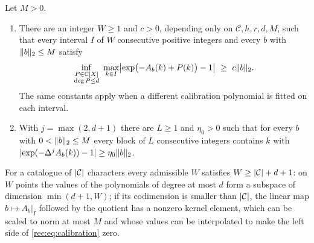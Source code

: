 \begin{theorem}\label{rec:thm:liblock}
Let $M>0$.
\begin{enumerate}[label=\textup{(\roman*)}]
\item There are an integer $W\ge1$ and $c>0$, depending only on $\mathcal C,h,r,d,M$, such that every interval $I$ of $W$
consecutive positive integers and every $b$ with $\lVert b\rVert_2\le M$ satisfy
\begin{equation}\label{rec:eq:calibration}
 \inf_{\substack{P\in\mathbb{C}[X]\\ \deg P\le d}}\ \max_{k\in I}\bigl\lvert\exp\bigl(-A_b(k)+P(k)\bigr)-1\bigr\rvert\ \ge\ c\lVert b\rVert_2 .
\end{equation}
The same constants apply when a different calibration polynomial is fitted on each interval.
\item With $j=\max(2,d+1)$ there are $L\ge1$ and $\eta_0>0$ such that for every $b$ with $0<\lVert b\rVert_2\le M$ every block of
$L$ consecutive integers contains $k$ with $\lvert\exp(-\Delta^jA_b(k))-1\rvert\ge\eta_0\lVert b\rVert_2$.
\end{enumerate}
\end{theorem}

For a catalogue of $\lvert\mathcal C\rvert$ characters every admissible $W$ satisfies $W\ge\lvert\mathcal C\rvert+d+1$: on $W$ points the
values of the polynomials of degree at most $d$ form a subspace of dimension $\min(d+1,W)$; if its codimension is
smaller than $\lvert\mathcal C\rvert$, the linear map $b\mapsto A_b|_I$ followed by the quotient has a nonzero kernel element,
which can be scaled to norm at most $M$ and whose values can be interpolated to make the left side of
\eqref{rec:eq:calibration} zero.

